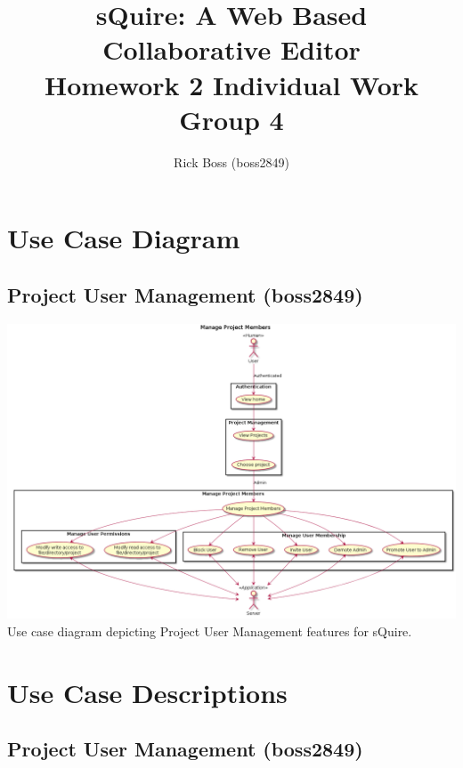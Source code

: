 \documentclass[11pt]{article}
\title{sQuire: A Web Based Collaborative Editor\\Homework 2 Individual Work\\Group 4}
\author{Rick Boss (boss2849)}
\begin{document}
\maketitle

\newpage
\tableofcontents
\newpage

\section{Use Case Diagram}
\subsection{Project User Management (boss2849)}
\includegraphics[width=1\textwidth]{../uml-diagram/user-management}
Use case diagram depicting Project User Management features for sQuire.

\section{Use Case Descriptions}
\subsection{Project User Management (boss2849)}
\end{document}
